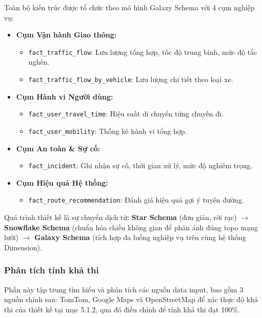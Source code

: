 Toàn bộ kiến trúc được tổ chức theo mô hình Galaxy Schema với 4 cụm nghiệp vụ:

\begin{itemize}
    \item \textbf{Cụm Vận hành Giao thông:}
    \begin{itemize}
        \item \texttt{fact\_traffic\_flow}: Lưu lượng tổng hợp, tốc độ trung bình, mức độ tắc nghẽn.
        \item \texttt{fact\_traffic\_flow\_by\_vehicle}: Lưu lượng chi tiết theo loại xe.
    \end{itemize}
    
    \item \textbf{Cụm Hành vi Người dùng:}
    \begin{itemize}
        \item \texttt{fact\_user\_travel\_time}: Hiệu suất di chuyển từng chuyến đi.
        \item \texttt{fact\_user\_mobility}: Thống kê hành vi tổng hợp.
    \end{itemize}
    
    \item \textbf{Cụm An toàn \& Sự cố:}
    \begin{itemize}
        \item \texttt{fact\_incident}: Ghi nhận sự cố, thời gian xử lý, mức độ nghiêm trọng.
    \end{itemize}
    
    \item \textbf{Cụm Hiệu quả Hệ thống:}
    \begin{itemize}
        \item \texttt{fact\_route\_recommendation}: Đánh giá hiệu quả gợi ý tuyến đường.
    \end{itemize}
\end{itemize}

Quá trình thiết kế là sự chuyển dịch từ: \textbf{Star Schema} (đơn giản, rời rạc) $\rightarrow$ \textbf{Snowflake Schema} (chuẩn hóa chiều không gian để phản ánh đúng topo mạng lưới) $\rightarrow$ \textbf{Galaxy Schema} (tích hợp đa luồng nghiệp vụ trên cùng hệ thống Dimension).



\subsubsection{Phân tích tính khả thi}
Phần này tập trung tìm hiểu và phân tích các nguồn data input, bao gồm 3 nguồn chính sau: TomTom, Google Maps và OpenStreetMap để xác thực độ khả thi của thiết kế tại mục 5.1.2, qua đó điều chỉnh để tính khả thi đạt 100\%.

